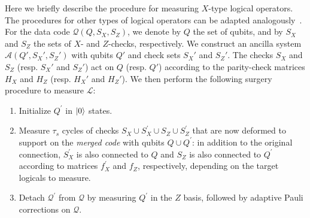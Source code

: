 \documentclass[reprint,twocolumn,secnumarabic,amssymb, aps, prx]{revtex4-2}
\newcommand{\taus}{\tau_s}
\begin{document}
Here we briefly describe the procedure for measuring $X$-type logical operators. The procedures for other types of logical operators can be adapted analogously~\cite{he2025extractors, cowtan2025parallel}. For the data code $\mathcal{Q}(Q, S_X, S_Z)$, we denote by $Q$ the set of qubits, and by $S_X$ and $S_Z$ the sets of $X$- and $Z$-checks, respectively. We construct an ancilla system $\mathcal{A}(Q', S_X', S_Z')$ with qubits $Q'$ and check sets $S_X'$ and $S_Z'$. The checks $S_X$ and $S_Z$ (resp. $S_X'$ and $S_Z'$) act on $Q$ (resp. $Q'$) according to the parity-check matrices $H_X$ and $H_Z$ (resp. $H_X'$ and $H_Z'$). We then perform the following surgery procedure to measure $\mathcal{L}$:
\begin{enumerate}
    \item Initialize $Q^{\prime}$ in $\ket{0}$ states.
    \item Measure $\taus$ cycles of checks $S_X\cup S_X^{\prime} \cup S_Z \cup S_Z^{\prime}$ that are now deformed to support on the \emph{merged code} with qubits $Q\cup Q^{\prime}$: in addition to the original connection, $S_X^{\prime}$ is also connected to $Q$ and $S_Z$ is also connected to $Q^{\prime}$ according to matrices $f_X^{\prime}$ and $f_Z$, respectively, depending on the target logicals to measure.
    \item Detach $\mathcal{Q}^{\prime}$ from $\mathcal{Q}$ by measuring $Q^{\prime}$ in the $Z$ basis, followed by adaptive Pauli corrections on $\mathcal{Q}$.  
\end{enumerate}
\end{document}
